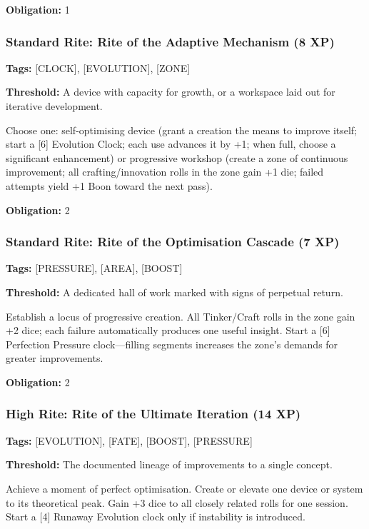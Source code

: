 \textbf{Obligation:} 1

\subsubsection{Standard Rite: Rite of the Adaptive Mechanism (8 XP)}

\textbf{Tags:} [CLOCK], [EVOLUTION], [ZONE]

\textbf{Threshold:} A device with capacity for growth, or a workspace laid out for iterative development.

Choose one: self-optimising device (grant a creation the means to improve itself; start a [6] Evolution Clock; each use advances it by +1; when full, choose a significant enhancement) or progressive workshop (create a zone of continuous improvement; all crafting/innovation rolls in the zone gain +1 die; failed attempts yield +1 Boon toward the next pass).

\textbf{Obligation:} 2

\subsubsection{Standard Rite: Rite of the Optimisation Cascade (7 XP)}

\textbf{Tags:} [PRESSURE], [AREA], [BOOST]

\textbf{Threshold:} A dedicated hall of work marked with signs of perpetual return.

Establish a locus of progressive creation. All Tinker/Craft rolls in the zone gain +2 dice; each failure automatically produces one useful insight. Start a [6] Perfection Pressure clock—filling segments increases the zone's demands for greater improvements.

\textbf{Obligation:} 2

\subsubsection{High Rite: Rite of the Ultimate Iteration (14 XP)}

\textbf{Tags:} [EVOLUTION], [FATE], [BOOST], [PRESSURE]

\textbf{Threshold:} The documented lineage of improvements to a single concept.

Achieve a moment of perfect optimisation. Create or elevate one device or system to its theoretical peak. Gain +3 dice to all closely related rolls for one session. Start a [4] Runaway Evolution clock only if instability is introduced.

